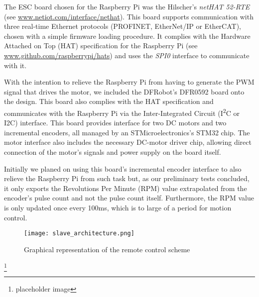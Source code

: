 The ESC board chosen for the Raspberry Pi was the Hilscher's \emph{netHAT 52-RTE} (see \url{www.netiot.com/interface/nethat}).
This board supports communication with three real-time Ethernet protocols (PROFINET, EtherNet/IP or EtherCAT), chosen with a simple firmware loading procedure.
It complies with the Hardware Attached on Top (HAT) specification for the Raspberry Pi (see \url{www.github.com/raspberrypi/hats}) and uses the \emph{SPI0} interface to communicate with it.

With the intention to relieve the Raspberry Pi from having to generate the PWM signal that drives the motor, we included the DFRobot's DFR0592 board onto the design.
This board also complies with the HAT specification and communicates with the Raspberry Pi via the Inter-Integrated Circuit (I\textsuperscript{2}C or I2C) interface.
This board provides interface for two DC motors and two incremental encoders, all managed by an STMicroelectronics's STM32 chip.
The motor interface also includes the necessary DC-motor driver chip, allowing direct connection of the motor's signals and power supply on the board itself.

Initially we planed on using this board's incremental encoder interface to also relieve the Raspberry Pi from such task but, as our preliminary tests concluded, it only exports the Revolutions Per Minute (RPM) value extrapolated from the encoder's pulse count and not the pulse count itself.
Furthermore, the RPM value is only updated once every 100ms, which is to large of a period for motion control.

\begin{figure}[htp]
	\centering
	\texttt{[image: slave\_architecture.png]}
	\caption{Graphical representation of the remote control scheme}
	\label{fig:slave_architecture}
\end{figure}\footnote{placeholder image}

